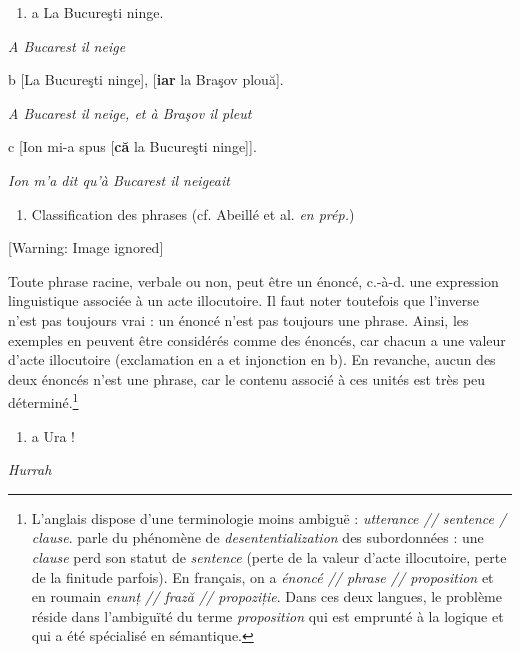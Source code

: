 \begin{enumerate}
\item \label{bkm:Ref283825471}a  La Bucureşti ninge.


\end{enumerate}
{\itshape
A Bucarest il neige}

  b  [La Bucureşti ninge], [\textbf{iar} la Braşov plouă].

{\itshape
A Bucarest il neige, et à Braşov il pleut} 

  c  [Ion mi-a spus [\textbf{că} la Bucureşti ninge]].

{\itshape
Ion m'a dit qu'à Bucarest il neigeait}


\begin{enumerate}
\item   \label{bkm:Ref299124709}Classification des phrases (cf. Abeillé et al. \textit{en prép.})


\end{enumerate}
{   [Warning: Image ignored] %
} 

Toute phrase racine, verbale ou non, peut être un énoncé, c.-à-d. une expression linguistique associée à un acte illocutoire. Il faut noter toutefois que l'inverse n'est pas toujours vrai : un énoncé n'est pas toujours une phrase. Ainsi, les exemples en  peuvent être considérés comme des énoncés, car chacun a une valeur d'acte illocutoire (exclamation en a et injonction en b). En revanche, aucun des deux énoncés n'est une phrase, car le contenu associé à ces unités est très peu déterminé.\footnote{L'anglais dispose d'une terminologie moins ambiguë : \textit{utterance // sentence / clause}. \citet{Huddleston1994} parle du phénomène de \textit{desententialization} des subordonnées : une \textit{clause} perd son statut de \textit{sentence} (perte de la valeur d'acte illocutoire, perte de la finitude parfois). En français, on a \textit{énoncé // phrase // proposition} et en roumain \textit{enunț // frază // propoziție}. Dans ces deux langues, le problème réside dans l'ambiguïté du terme \textit{proposition} qui est emprunté à la logique et qui a été spécialisé en sémantique.} 


\begin{enumerate}
\item \label{bkm:Ref283828126}a  Ura !


\end{enumerate}
{\itshape
Hurrah} 

